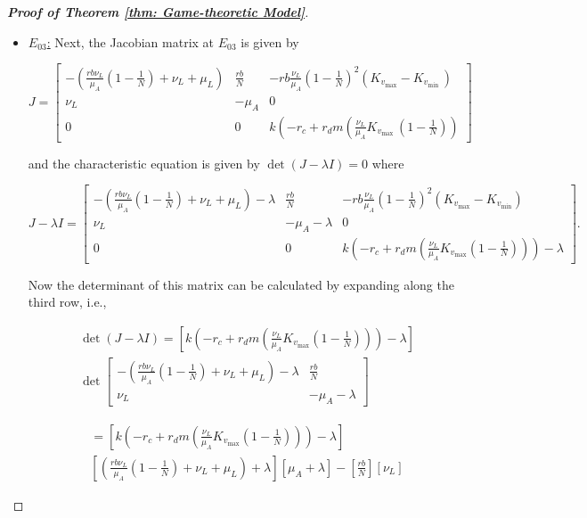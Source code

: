 \documentclass[10pt,a4paper]{amsart}
\begin{document}
\begin{proof}[\textbf{Proof of Theorem \ref{thm: Game-theoretic Model}}]
\begin{itemize}
 \item \underline{$E_{03}$:} Next, the Jacobian matrix at $E_{03}$ is given by

$$
J=\left[\begin{array}{ccc}
-\left(\frac{r b \nu_L}{\mu_A}\left(1-\frac{1}{{N}}\right)+\nu_L+\mu_L\right) & \frac{r b}{{N}} & -r b \frac{\nu_L}{\mu_A}\left(1-\frac{1}{{N}}\right)^2\left(K_{v_{\max }}-K_{v_{\text {min }}}\right) \\
\nu_L & -\mu_A & 0 \\
0 & 0 & k\left(-r_c+r_d m\left(\frac{\nu_L}{\mu_A} K_{v_{\text {max }}}\left(1-\frac{1}{{N}}\right)\right)\right.
\end{array}\right]
$$

and the characteristic equation is given by \(\det(J - \lambda I) = 0\) where

\[
J-\lambda I = \left[
\begin{array}{ccc}
-\left(\frac{r b \nu_L}{\mu_A}\left(1 - \frac{1}{{N}}\right) + \nu_L + \mu_L\right) - \lambda 
& \frac{r b}{{N}} 
& -r b \frac{\nu_L}{\mu_A}\left(1 - \frac{1}{{N}}\right)^2\left(K_{v_{\max}} - K_{v_{\min}}\right) \\
\nu_L 
& -\mu_A - \lambda 
& 0 \\
0 
& 0 
& k\left(-r_c + r_d  m \left(\frac{\nu_L}{\mu_A} K_{v_{\max}}\left(1 - \frac{1}{{N}}\right)\right)\right) - \lambda
\end{array}
\right].
\]

Now the determinant of this matrix can be calculated by expanding along the third row, i.e.,

$$
\begin{aligned}
& \operatorname{det}(J-\lambda I)=\left[k\left(-r_c+r_d m\left(\frac{\nu_L}{\mu_A} K_{v_{\max }}\left(1-\frac{1}{{N}}\right)\right)\right)-\lambda\right] \\
& \operatorname{det}\left[\begin{array}{cc}
-\left(\frac{r b \nu_L}{\mu_A}\left(1-\frac{1}{{N}}\right)+\nu_L+\mu_L\right)-\lambda & \frac{r b}{{N}} \\
\nu_L & -\mu_A-\lambda
\end{array}\right]
\end{aligned}
$$

$$
\begin{aligned}
&=\left[k\left(-r_c+r_d m\left(\frac{\nu_L}{\mu_A} K_{v_{\max }}\left(1-\frac{1}{{N}}\right)\right)\right)-\lambda\right]\\
& {\left[\left(\frac{r b \nu_L}{\mu_A}\left(1-\frac{1}{{N}}\right)+\nu_L+\mu_L\right)+\lambda\right]\left[\mu_A+\lambda\right]-\left[\frac{r b}{{N}}\right]\left[\nu_L\right] }
\end{aligned}
$$


\end{itemize}
\end{proof}
\end{document}
